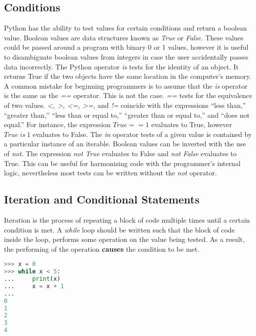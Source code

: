 \subsection{Conditions}

Python has the ability to test values for certain conditions and return a boolean value. Boolean values are data structures known as \textit{True} or \textit{False}. These values could be passed around a program with binary 0 or 1 values, however it is useful to disambiguate boolean values from integers in case the user accidentally passes data incorrectly. The Python operator \textit{is} tests for the identity of an object. It returns True if the two objects have the same location in the computer's memory. A common mistake for beginning programmers is to assume that the \textit{is} operator is the same as the \textit{==} operator. This is not the case. \textit{==} tests for the equivalence of two values. \textit{<, >, <=, >=,} and \textit{!=} coincide with the expressions ``less than,'' ``greater than,'' ``less than or equal to,'' ``greater than or equal to,'' and ``does not equal.'' For instance, the expression $True == 1$ evaluates to True, however $True\: is\: 1$ evaluates to False. The \textit{in} operator tests of a given value is contained by a particular instance of an iterable. Boolean values can be inverted with the use of \textit{not}. The expression \textit{not True} evaluates to False and \textit{not False} evaluates to True. This can be useful for harmonizing code with the programmer's internal logic, nevertheless most tests can be written without the \textit{not} operator.

\subsection{Iteration and Conditional Statements}

Iteration is the process of repeating a block of code multiple times until a certain condition is met. A \textit{while} loop should be written such that the block of code inside the loop, performs some operation on the value being tested. As a result, the performing of the operation \textbf{causes} the condition to be met.

\begin{lstlisting}[language=Python,frame=tb,caption={A simple while loop},label=lst:while]
>>> x = 0
>>> while x < 5:
...     print(x)
...     x = x + 1
... 
0
1
2
3
4
\end{lstlisting}

